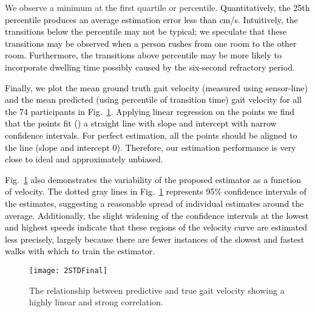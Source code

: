 \documentclass[journal]{IEEEtran}
\newcommand{\RR}[1]{\textcolor{black}{#1}}
\newcommand{\DA}[1]{\textcolor{black}{#1}}
\begin{document}
We observe a minimum at the first quartile or  percentile. \DA{Quantitatively, the 25th percentile produces an average estimation error less than \RR{} cm/s}. \RR{Intuitively, the transitions below the  percentile may not be typical; we speculate that these transitions may be observed when a person rushes from one room to the other room. Furthermore, the transitions above  percentile may be more likely to incorporate dwelling time possibly caused by the six-second refractory period. 
}

\RR{Finally, we plot the mean ground truth gait velocity (measured using sensor-line) and the mean predicted (using  percentile of transition time) gait velocity for all the 74 participants in Fig.~\ref{fig:compareTwoMean}. Applying linear regression on the points we find that the points fit () a straight line with slope  and intercept  with narrow  confidence intervals. 
For perfect estimation, all the points should be aligned to the line  (slope  and intercept 0). Therefore, our estimation performance is very close to ideal and approximately unbiased.}

\DA{Fig.~\ref{fig:compareTwoMean} also demonstrates the variability of the proposed estimator as a function of velocity.  The dotted gray lines in Fig.~\ref{fig:compareTwoMean} represents 95\% confidence intervals of the estimates, suggesting a reasonable spread of individual estimates around the average.  Additionally, the slight widening of the confidence intervals at the lowest and highest speeds indicate that these regions of the velocity curve are estimated less precisely, largely because there are fewer instances of the slowest and fastest walks with which to train the estimator.}





\begin{figure}
\centering
\texttt{[image: 2STDFinal]}
\caption{The relationship between predictive and true gait velocity showing a highly linear
and strong correlation.}
\label{fig:compareTwoMean}
\end{figure}
\end{document}
